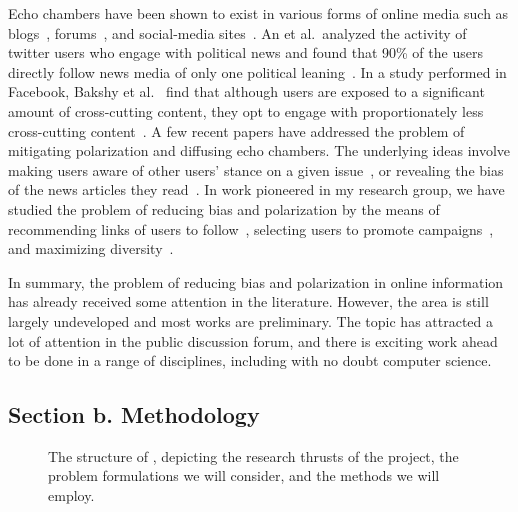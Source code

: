 \documentclass[a4paper,11pt]{article}
\begin{document}
\smallskip
Echo chambers have been shown to exist in various forms of online media such as 
blogs~\cite{gilbert2009blogs,wallsten2005political}, forums~\cite{edwards2013participants}, and 
social-media sites~\cite{barbera2015tweeting,gromping2014echo,quattrociocchi2016echo}.
An et al.\ analyzed the activity of twitter users who engage with political news
and found that 90\% of the users directly follow news media of only one political leaning~\cite{an2014sharing}. 
In a study performed in Facebook, Bakshy et al.\
find that although users are exposed to a significant amount of cross-cutting content, 
they opt to engage with proportionately less cross-cutting content~\cite{bakshy2015exposure}.
% 
A few recent papers have addressed the problem of 
mitigating polarization and diffusing echo chambers. 
The underlying ideas involve making users aware 
of other users' stance on a given issue~\cite{liao2014can,liao2014expert}, 
or revealing the bias of the news articles they read~\cite{munson2013encouraging}.
In work pioneered in my research group, 
we have studied the problem of reducing bias and polarization
by the means of 
recommending links of users to follow~\cite{garimella2017reducing},
selecting users to promote campaigns~\cite{garimella2017balancing},
and maximizing diversity~\cite{diversity-cascade,diversity-static}.

\smallskip
In summary, the problem of reducing bias and polarization in online information
has already received some attention in the literature.
However, the area is still largely undeveloped and most works are preliminary.
The topic has attracted a lot of attention in the public discussion forum, 
and there is exciting work ahead to be done in a range of disciplines, 
including with no doubt computer science.


\subsection*{Section b. Methodology}

\begin{figure}[t]
\begin{center}
{\scalebox{0.96}{\small}}
\caption{\label{figure:structure}
The structure of {\acronym}, depicting the research thrusts of the project, 
the problem formulations we will consider, and the methods we will employ.}
\end{center}
\vspace{-4mm}
\end{figure}
\end{document}
